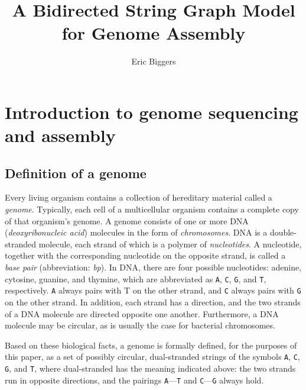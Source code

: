 \documentclass[10pt]{article}
\title{A Bidirected String Graph Model for Genome Assembly}
\author{Eric Biggers}
\newcommand\Base[1]{{\tt #1}}
\newcommand{\KeyTerm}[1]{{\it #1}}
\begin{document}
\maketitle


\section{Introduction to genome sequencing and assembly}

\subsection{Definition of a genome}

Every living organism contains a collection of hereditary material called a
\KeyTerm{genome}.  Typically, each cell of a multicellular organism contains a
complete copy of that organism's genome.  A genome consists of one or more DNA
(\KeyTerm{deoxyribonucleic acid}) molecules in the form of
\KeyTerm{chromosomes}.  DNA is a double-stranded molecule, each strand of which
is a polymer of \KeyTerm{nucleotides}.  A nucleotide, together with the
corresponding nucleotide on the opposite strand, is called a \KeyTerm{base pair}
(abbreviation: \KeyTerm{bp}).  In DNA, there are four possible nucleotides:
adenine, cytosine, guanine, and thymine, which are abbreviated as \Base{A},
\Base{C}, \Base{G}, and \Base{T}, respectively.  \Base{A} always pairs with T on
the other strand, and \Base{C} always pairs with \Base{G} on the other strand.
In addition, each strand has a direction, and the two strands of a DNA molecule
are directed opposite one another.  Furthermore, a DNA molecule may be circular,
as is usually the case for bacterial chromosomes.

Based on these biological facts, a genome is formally defined, for the purposes
of this paper, as a set of possibly circular, dual-stranded strings of the
symbols \Base{A}, \Base{C}, \Base{G}, and \Base{T}, where dual-stranded has the
meaning indicated above: the two strands run in opposite directions, and the
pairings \Base{A}---\Base{T} and \Base{C}---\Base{G} always hold.
\end{document}
